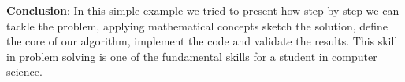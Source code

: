 \documentclass[11pt]{article}
\begin{document}
    \textbf{Conclusion}: In this simple example we tried to present how
step-by-step we can tackle the problem, applying mathematical concepts
sketch the solution, define the core of our algorithm, implement the
code and validate the results. This skill in problem solving is one of
the fundamental skills for a student in computer science.


    
    
    
    
\end{document}
